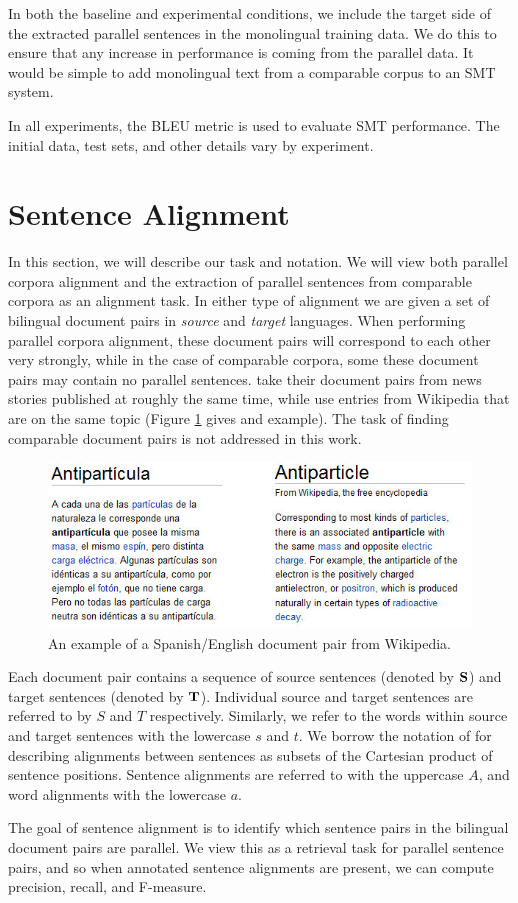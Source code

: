In both the baseline and experimental conditions, we include the target side of
the extracted parallel sentences in the monolingual training data. We do this to
ensure that any increase in performance is coming from the parallel data. It
would be simple to add monolingual text from a comparable corpus to an SMT
system.

In all experiments, the BLEU metric \citep{Papineni02} is used to evaluate SMT
performance. The initial data, test sets, and other details vary by
experiment.

\section{Sentence Alignment}
In this section, we will describe our task and notation.
We will view both parallel corpora alignment and the extraction of parallel
sentences from comparable corpora as an alignment task. In either type of
alignment we are given a set of bilingual document pairs in {\em source} and {\em
target} languages. When performing parallel corpora alignment, these document
pairs will correspond to each other very strongly, while in the case of
comparable corpora, some these document pairs may contain no parallel sentences.
\citet{Munteanu05} take their document pairs from news stories published at
roughly the same time, while \citet{Adafre06,Smith10} use entries from
Wikipedia that are on the same topic (Figure \ref{fig:wiki} gives and example).
The task of finding comparable document pairs is not addressed in this work.

\begin{figure}[ht]
\includegraphics[width=\textwidth]{images/wiki.jpg}
\caption{An example of a Spanish/English document pair from Wikipedia.}
\label{fig:wiki}
\end{figure}

Each document pair contains a sequence of source sentences (denoted by ${\bf
S}$) and target sentences (denoted by ${\bf T}$). Individual source and target
sentences are referred to by $S$ and $T$ respectively. Similarly, we refer to
the words within source and target sentences with the lowercase $s$ and $t$. We
borrow the notation of \citep{Och03} for describing alignments between sentences
as subsets of the Cartesian product of sentence positions. Sentence alignments
are referred to with the uppercase $A$, and word alignments with the lowercase
$a$.

The goal of sentence alignment is to identify which sentence pairs in the
bilingual document pairs are parallel. We view this as a retrieval task for
parallel sentence pairs, and so when annotated sentence alignments are present,
we can compute precision, recall, and F-measure.
